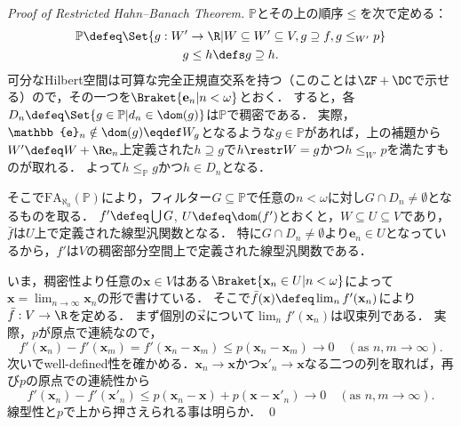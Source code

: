\documentclass[a4j,leqno]{ltjsarticle}
\newcommand{\FA}{\mathrm{FA}}
\begin{document}
\begin{proof}[Proof of Restricted Hahn--Banach Theorem]
 $\mathbb{P}$とその上の順序$\leq$を次で定める：
 \begin{gather*}
  \mathbb{P} \defeq \Set{ g : W' \to \R | W \subseteq W' \subseteq V, g \supseteq f, g \leq_{W'} p}\\
  g \leq h \defs g \supseteq h.
 \end{gather*}
 可分なHilbert空間は可算な完全正規直交系を持つ（このことは$\ZF+\DC$で示せる）ので，その一つを$\Braket{\mathbf{e}_n | n < \omega}$とおく．
 すると，各$D_n \defeq \Set{g \in \mathbb{P} | d_n \in \dom(g)}$は$\mathbb{P}$で稠密である．
 実際，$\mathbb{e}_n \notin \dom(g) \eqdef W_g$となるような$g \in \mathbb{P}$があれば，上の補題から$W' \defeq W + \R\mathbf{e}_n$上定義された$h \supseteq g$で$h \restr W = g$かつ$h \leq_{W'} p$を満たすものが取れる．
 よって$h \leq_{\mathbb{P}} g$かつ$h \in D_n$となる．

 そこで$\FA_{\aleph_0}(\mathbb{P})$により，フィルター$G \subseteq \mathbb{P}$で任意の$n < \omega$に対し$G \cap D_n \neq \emptyset$となるものを取る．
 $f' \defeq \bigcup G$, $U \defeq \dom(f')$とおくと，$W \subseteq U \subseteq V$であり，$\bar{f}$は$U$上で定義された線型汎関数となる．
 特に$G \cap D_n \neq \emptyset$より$\mathbf{e}_n \in U$となっているから，$f'$は$V$の稠密部分空間上で定義された線型汎関数である．

 いま，稠密性より任意の$\mathbf{x} \in V$はある$\Braket{\mathbf{x}_n \in U | n < \omega}$によって$\mathbf{x} = \lim_{n \to \infty} \mathbf{x}_n$の形で書けている．
 そこで$\bar{f}(\mathbf{x}) \defeq \lim_n f'(\mathbf{x}_n)$により$\bar{f}: V \to \R$を定める．
 まず個別の$\vec{\mathbf{x}}$について$\lim_n f'(\mathbf{x}_n)$は収束列である．
 実際，$p$が原点で連続なので，
 \[
    f'(\mathbf{x}_n) - f'(\mathbf{x}_m)
  = f'(\mathbf{x}_n - \mathbf{x}_m)
  \leq p(\mathbf{x}_n - \mathbf{x}_m) \to 0\quad (\text{as } n, m \to \infty).
 \]
 次いでwell-defined性を確かめる．$\mathbf{x}_n \to \mathbf{x}$かつ$\mathbf{x}'_n \to \mathbf{x}$なる二つの列を取れば，再び$p$の原点での連続性から
 \[
  f'(\mathbf{x}_n) - f'(\mathbf{x}'_n) \leq p(\mathbf{x}_n - \mathbf{x}) + p(\mathbf{x} - \mathbf{x}'_n) \to 0 \quad (\text{as } n, m \to \infty).
 \]
 線型性と$p$で上から押さえられる事は明らか． \qed
\end{proof}
\end{document}
